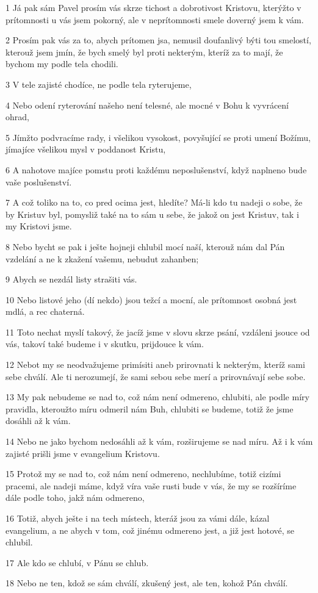 \par 1 Já pak sám Pavel prosím vás skrze tichost a dobrotivost Kristovu, kterýžto v prítomnosti u vás jsem pokorný, ale v neprítomnosti smele doverný jsem k vám.
\par 2 Prosím pak vás za to, abych prítomen jsa, nemusil doufanlivý býti tou smelostí, kterouž jsem jmín, že bych smelý byl proti nekterým, kteríž za to mají, že bychom my podle tela chodili.
\par 3 V tele zajisté chodíce, ne podle tela ryterujeme,
\par 4 Nebo odení ryterování našeho není telesné, ale mocné v Bohu k vyvrácení ohrad,
\par 5 Jímžto podvracíme rady, i všelikou vysokost, povyšující se proti umení Božímu, jímajíce všelikou mysl v poddanost Kristu,
\par 6 A nahotove majíce pomstu proti každému neposlušenství, když naplneno bude vaše poslušenství.
\par 7 A což toliko na to, co pred ocima jest, hledíte? Má-li kdo tu nadeji o sobe, že by Kristuv byl, pomysliž také na to sám u sebe, že jakož on jest Kristuv, tak i my Kristovi jsme.
\par 8 Nebo bycht se pak i ješte hojneji chlubil mocí naší, kterouž nám dal Pán vzdelání a ne k zkažení vašemu, nebudut zahanben;
\par 9 Abych se nezdál listy strašiti vás.
\par 10 Nebo listové jeho (dí nekdo) jsou težcí a mocní, ale prítomnost osobná jest mdlá, a rec chaterná.
\par 11 Toto nechat myslí takový, že jacíž jsme v slovu skrze psání, vzdáleni jsouce od vás, takoví také budeme i v skutku, prijdouce k vám.
\par 12 Nebot my se neodvažujeme primísiti aneb prirovnati k nekterým, kteríž sami sebe chválí. Ale ti nerozumejí, že sami sebou sebe merí a prirovnávají sebe sobe.
\par 13 My pak nebudeme se nad to, což nám není odmereno, chlubiti, ale podle míry pravidla, kteroužto míru odmeril nám Buh, chlubiti se budeme, totiž že jsme dosáhli až k vám.
\par 14 Nebo ne jako bychom nedosáhli až k vám, rozširujeme se nad míru. Až i k vám zajisté prišli jsme v evangelium Kristovu.
\par 15 Protož my se nad to, což nám není odmereno, nechlubíme, totiž cizími pracemi, ale nadeji máme, když víra vaše rusti bude v vás, že my se rozšíríme dále podle toho, jakž nám odmereno,
\par 16 Totiž, abych ješte i na tech místech, kteráž jsou za vámi dále, kázal evangelium, a ne abych v tom, což jinému odmereno jest, a již jest hotové, se chlubil.
\par 17 Ale kdo se chlubí, v Pánu se chlub.
\par 18 Nebo ne ten, kdož se sám chválí, zkušený jest, ale ten, kohož Pán chválí.

